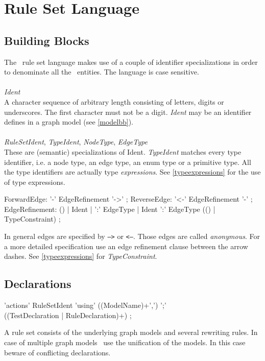 \chapter{Rule Set Language}

\section{Building Blocks}
\label{rulebb}

The \GrG\ rule set language makes use of a couple of identifier specializations in order to denominate all the \GrG\ entities. The language is case sensitive.\\
\\
\emph{Ident}\\ \nopagebreak
A character sequence of arbitrary length consisting of letters, digits or underscores. The first character must not be a digit. \emph{Ident} may be an identifier defines in a graph model (see \ref{modelbb}).\\
\\
\emph{RuleSetIdent}, \emph{TypeIdent}, \emph{NodeType}, \emph{EdgeType}\\
These are (semantic) specializations of Ident. \emph{TypeIdent} matches every type identifier, i.e. a node type, an edge type, an enum type or a primitive type. All the type identifiers are actually type \emph{expressions}. See \ref{typeexpressions} for the use of type expressions.\\

\begin{rail}
  ForwardEdge: '-' EdgeRefinement '->' ;
  ReverseEdge: '<-' EdgeRefinement '-' ;  
  EdgeRefinement: () | Ident | ':' EdgeType | Ident ':' EdgeType (() | TypeConstraint) ;
\end{rail}
In general edges are specified by \texttt{-->} or \texttt{<--}. Those edges are called \emph{anonymous}. For a more detailed specification use an edge refinement clause between the arrow dashes. See \ref{typeexpressions} for \emph{TypeConstraint}.

\section{Declarations}

\begin{rail}
  'actions' RuleSetIdent 'using' ((ModelName)+',') ';' \\ ((TestDeclaration | RuleDeclaration)+) ;
\end{rail}
A rule set consists of the underlying graph models and several rewriting rules. In case of multiple graph models \GrG\ use the unification of the models. In this case beware of conflicting declarations.

